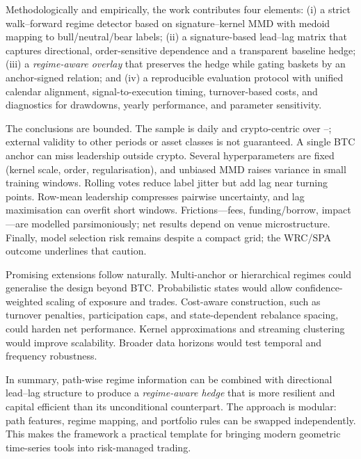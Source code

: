 Methodologically and empirically, the work contributes four elements: (i) a strict walk–forward regime detector based on signature–kernel MMD with medoid mapping to bull/neutral/bear labels; (ii) a signature-based lead--lag matrix that captures directional, order-sensitive dependence and a transparent baseline hedge; (iii) a \emph{regime-aware overlay} that preserves the hedge while gating baskets by an anchor-signed relation; and (iv) a reproducible evaluation protocol with unified calendar alignment, signal-to-execution timing, turnover-based costs, and diagnostics for drawdowns, yearly performance, and parameter sensitivity.

The conclusions are bounded. The sample is daily and crypto-centric over \sampleStart{}–\sampleEnd{}; external validity to other periods or asset classes is not guaranteed. A single BTC anchor can miss leadership outside crypto. Several hyperparameters are fixed (kernel scale, order, regularisation), and unbiased MMD raises variance in small training windows. Rolling votes reduce label jitter but add lag near turning points. Row-mean leadership compresses pairwise uncertainty, and lag maximisation can overfit short windows. Frictions—fees, funding/borrow, impact—are modelled parsimoniously; net results depend on venue microstructure. Finally, model selection risk remains despite a compact grid; the WRC/SPA outcome underlines that caution.

Promising extensions follow naturally. Multi-anchor or hierarchical regimes could generalise the design beyond BTC. Probabilistic states would allow confidence-weighted scaling of exposure and trades. Cost-aware construction, such as turnover penalties, participation caps, and state-dependent rebalance spacing, could harden net performance. Kernel approximations and streaming clustering would improve scalability. Broader data horizons would test temporal and frequency robustness.

In summary, path-wise regime information can be combined with directional lead--lag structure to produce a \emph{regime-aware hedge} that is more resilient and capital efficient than its unconditional counterpart. The approach is modular: path features, regime mapping, and portfolio rules can be swapped independently. This makes the framework a practical template for bringing modern geometric time-series tools into risk-managed trading.
